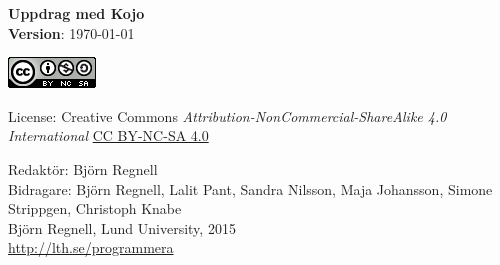 { \vspace{250mm}\fontsize{11}{11}\flushleft\selectfont 
\vspace*{\fill}

\begin{center}
\Huge {\bf Uppdrag med Kojo}\\
\Large {\bf Version}: \today{ }
\end{center}
\vskip7cm

\large
\includegraphics{../img/cc.png}

License: Creative Commons {\it Attribution-NonCommercial-ShareAlike 4.0 International} 
\href{http://creativecommons.org/licenses/by-nc-sa/4.0/}{CC BY-NC-SA 4.0}

Redaktör: Björn Regnell\\
Bidragare: Björn Regnell, Lalit Pant, Sandra Nilsson, Maja Johansson, Simone Strippgen, Christoph Knabe \\
\textcopyright{ }Björn Regnell, Lund University, 2015 \\
\url{http://lth.se/programmera}
}